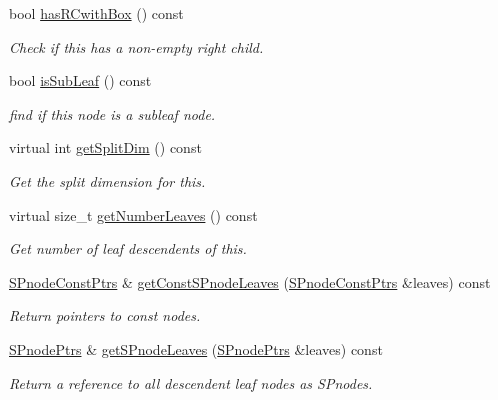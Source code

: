 \begin{DoxyCompactItemize}
bool \hyperlink{classsubpavings_1_1SPnode_a8127bcccc0023f632307c22f685196aa}{has\-R\-Cwith\-Box} () const 
\begin{DoxyCompactList}\small\item\em \-Check if this has a non-\/empty right child. \end{DoxyCompactList}\item 
bool \hyperlink{classsubpavings_1_1SPnode_a079c914f2e19278844d934baad47fbfc}{is\-Sub\-Leaf} () const 
\begin{DoxyCompactList}\small\item\em find if this node is a subleaf node. \end{DoxyCompactList}\item 
virtual int \hyperlink{classsubpavings_1_1SPnode_ad04e240d9152c1a927c2ec280aa29371}{get\-Split\-Dim} () const 
\begin{DoxyCompactList}\small\item\em \-Get the split dimension for this. \end{DoxyCompactList}\item 
virtual size\-\_\-t \hyperlink{classsubpavings_1_1SPnode_ad9f203ab98f3e2766ee0acafddb5ea23}{get\-Number\-Leaves} () const 
\begin{DoxyCompactList}\small\item\em \-Get number of leaf descendents of this. \end{DoxyCompactList}\item 
\hyperlink{namespacesubpavings_a0c617b55345023a4c205603c167801b6}{\-S\-Pnode\-Const\-Ptrs} \& \hyperlink{classsubpavings_1_1SPnode_aa19d97146cec96a5a52eba91a9633897}{get\-Const\-S\-Pnode\-Leaves} (\hyperlink{namespacesubpavings_a0c617b55345023a4c205603c167801b6}{\-S\-Pnode\-Const\-Ptrs} \&leaves) const 
\begin{DoxyCompactList}\small\item\em \-Return pointers to const nodes. \end{DoxyCompactList}\item 
\hyperlink{namespacesubpavings_ad64ec5e254ada5d913b9f7b46dcddc49}{\-S\-Pnode\-Ptrs} \& \hyperlink{classsubpavings_1_1SPnode_ad3548bf27557e71e7254e211e95f1878}{get\-S\-Pnode\-Leaves} (\hyperlink{namespacesubpavings_ad64ec5e254ada5d913b9f7b46dcddc49}{\-S\-Pnode\-Ptrs} \&leaves) const 
\begin{DoxyCompactList}\small\item\em \-Return a reference to all descendent leaf nodes as \-S\-Pnodes. \end{DoxyCompactList}\item 

\end{DoxyCompactItemize}
